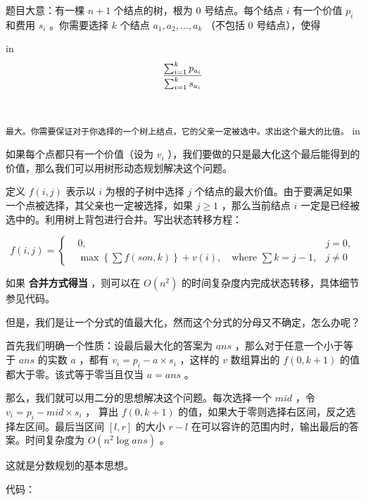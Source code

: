 
\begin{NOTE}{}{}
题目大意：有一棵 $n+1$ 个结点的树，根为 $0$ 号结点。每个结点 $i$ 有一个价值 $p_i$ 和费用 $s_i$ 。你需要选择 $k$ 个结点 $a_1,a_2,\ldots,a_k$ （不包括 $0$ 号结点），使得
\end{NOTE}


 in
\texttt{
$$\\\frac{\sum_{i=1}^k p_{a_i}}{\sum_{i=1}^k s_{a_i}}\\$$\\\\最大。你需要保证对于你选择的一个树上结点，它的父亲一定被选中。求出这个最大的比值。}
 in

如果每个点都只有一个价值（设为 $v_i$ ），我们要做的只是最大化这个最后能得到的价值，那么我们可以用树形动态规划解决这个问题。

定义 $f(i,j)$ 表示以 $i$ 为根的子树中选择 $j$ 个结点的最大价值。由于要满足如果一个点被选择，其父亲也一定被选择，如果 $j\ge 1$ ，那么当前结点 $i$ 一定是已经被选中的。利用树上背包进行合并。写出状态转移方程：

$$
f(i,j)=\left\{
\begin{aligned}
& 0, & j=0, \\
& \max\left\{\sum f(son,k)\right\}+v(i),\quad\text{where }\sum k=j-1, & j\neq 0
\end{aligned} \right
.
$$

如果 \textbf{ 合并方式得当 } ，则可以在 $O(n^2)$ 的时间复杂度内完成状态转移，具体细节参见代码。

但是，我们是让一个分式的值最大化，然而这个分式的分母又不确定，怎么办呢？

首先我们明确一个性质：设最后最大化的答案为 $ans$ ，那么对于任意一个小于等于 $ans$ 的实数 $a$ ，都有 $v_i=p_i-a\times s_i$ ，这样的 $v$ 数组算出的 $f(0,k+1)$ 的值都大于零。该式等于零当且仅当 $a=ans$ 。

那么，我们就可以用二分的思想解决这个问题。每次选择一个 $mid$ ，令 $v_i=p_i-mid\times s_i$ ， 算出 $f(0,k+1)$ 的值，如果大于零则选择右区间，反之选择左区间。最后当区间 $[l,r]$ 的大小 $r-l$ 在可以容许的范围内时，输出最后的答案。时间复杂度为 $O(n^2\log ans)$ 。

这就是分数规划的基本思想。

代码：

